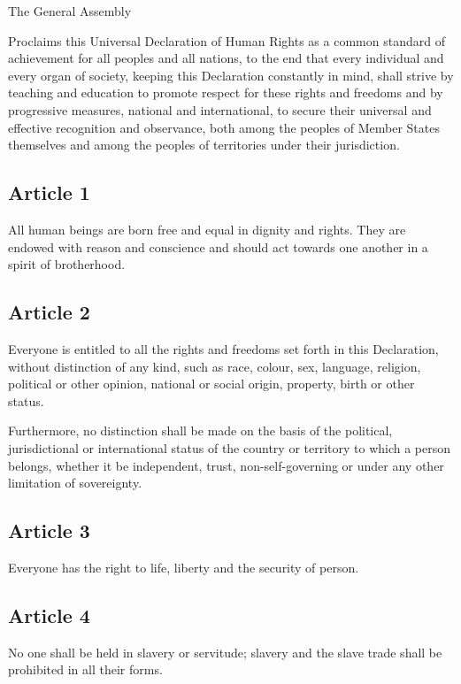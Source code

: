 \documentclass[
  ngerman,
  american,
  titlepage,
  openright,
  DIV=calc,
  toc=listof,
  listof=nochaptergap]{scrbook}
\begin{document}
The General Assembly

Proclaims this Universal Declaration of Human Rights as a common
standard of achievement for all peoples and all nations, to the end that
every individual and every organ of society, keeping this Declaration
constantly in mind, shall strive by teaching and education to promote
respect for these rights and freedoms and by progressive measures,
national and international, to secure their universal and effective
recognition and observance, both among the peoples of Member States
themselves and among the peoples of territories under their
jurisdiction.

\subsection{Article 1}\label{article-1}

All human beings are born free and equal in dignity and rights. They are
endowed with reason and conscience and should act towards one another in
a spirit of brotherhood.

\subsection{Article 2}\label{article-2}

Everyone is entitled to all the rights and freedoms set forth in this
Declaration, without distinction of any kind, such as race, colour, sex,
language, religion, political or other opinion, national or social
origin, property, birth or other status.

Furthermore, no distinction shall be made on the basis of the political,
jurisdictional or international status of the country or territory to
which a person belongs, whether it be independent, trust,
non-self-governing or under any other limitation of sovereignty.

\subsection{Article 3}\label{article-3}

Everyone has the right to life, liberty and the security of person.

\subsection{Article 4}\label{article-4}

No one shall be held in slavery or servitude; slavery and the slave
trade shall be prohibited in all their forms.
\end{document}

